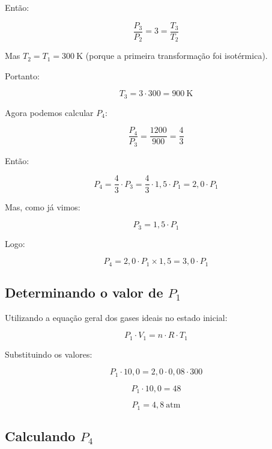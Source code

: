 \documentclass[a4paper,12pt]{article}
\begin{document}
\begin{flushleft}
Então:

\begin{equation}
\frac{P_3}{P_2} = 3 = \frac{T_3}{T_2}
\end{equation}

Mas $T_2 = T_1 = 300 \ \text{K}$ (porque a primeira transformação foi isotérmica).

Portanto:

\begin{equation}
T_3 = 3 \cdot 300 = 900 \ \text{K}
\end{equation}

Agora podemos calcular $P_4$:

\begin{equation}
\frac{P_4}{P_3} = \frac{1200}{900} = \frac{4}{3}
\end{equation}

Então:

\begin{equation}
P_4 = \frac{4}{3} \cdot P_3 = \frac{4}{3} \cdot 1,5 \cdot P_1 = 2,0 \cdot P_1
\end{equation}

Mas, como já vimos:

\[
P_3 = 1,5 \cdot P_1
\]

Logo:

\[
P_4 = 2,0 \cdot P_1 \times 1,5 = 3,0 \cdot P_1
\]

\subsection*{Determinando o valor de $P_1$}

Utilizando a equação geral dos gases ideais no estado inicial:

\begin{equation}
P_1 \cdot V_1 = n \cdot R \cdot T_1
\end{equation}

Substituindo os valores:

\begin{equation}
P_1 \cdot 10,0 = 2,0 \cdot 0,08 \cdot 300
\end{equation}

\begin{equation}
P_1 \cdot 10,0 = 48
\end{equation}

\begin{equation}
P_1 = 4,8 \ \text{atm}
\end{equation}

\subsection*{Calculando $P_4$}


\end{flushleft}
\end{document}
